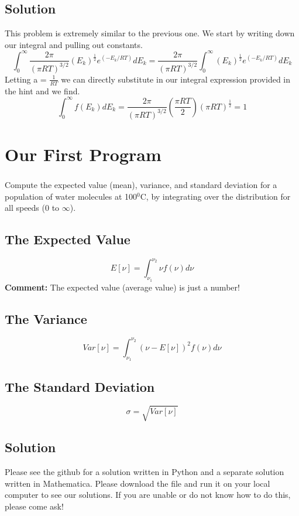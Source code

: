 \documentclass{article}
\newcommand{\be}{\begin{equation}}
\newcommand{\ee}{\end{equation}}
\begin{document}
\subsection*{Solution}
This problem is extremely similar to the previous one. 
We start by writing down our integral and pulling out constants. 
\be
\int_0^\infty \frac{2\pi}{(\pi RT)^{3/2}} \left(E_k\right)^{\frac{1}{2}} e^{\left(-E_k/RT\right)} dE_k = \frac{2\pi}{(\pi RT)^{3/2}} \int_0^\infty \left(E_k\right)^{\frac{1}{2}} e^{\left(-E_k/RT\right)} dE_k
\ee
Letting a = $\frac{1}{RT}$ we can directly substitute in our integral expression provided in the hint and we find. 
\be
\int_0^\infty f(E_k)dE_k = \frac{2\pi}{(\pi RT)^{3/2}} \left(\frac{\pi RT}{2}\right) \left(\pi RT\right)^{\frac{1}{2}} = 1
\ee

\section{Our First Program}

\subsubsection*{}
Compute the expected value (mean), variance, and standard deviation for a population of water molecules at 100$^0$C,
by integrating over the distribution for all speeds (0 to $\infty$). \\

\subsection{The Expected Value} 
\be
E[\nu] = \int_{\nu_1}^{\nu_2} \nu f(\nu) d\nu 
\ee
\textbf{Comment:} The expected value (average value) is just a number!

\subsection{The Variance}
\be
Var[\nu] = \int_{\nu_1}^{\nu_2} \left(\nu-E[\nu]\right)^2 f(\nu) d\nu 
\ee

\subsection{The Standard Deviation}
\be
\sigma = \sqrt{Var[\nu]}
\ee

\subsection*{Solution}
Please see the github for a solution written in Python and a separate solution written in Mathematica. 
Please download the file and run it on your local computer to see our solutions. 
If you are unable or do not know how to do this, please come ask!
\end{document}
